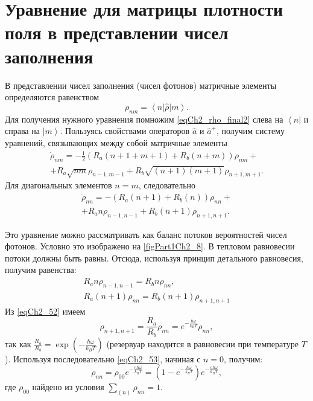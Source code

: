 \section{Уравнение для матрицы плотности поля в представлении чисел
  заполнения}
\label{ch2_7}
В представлении чисел заполнения (чисел фотонов) матричные элементы
определяются равенством
\[
\rho_{nm} = \left<n\right|\hat{\rho}\left|m\right>.
\]
Для получения нужного уравнения помножим
\eqref{eqCh2_rho_final2} слева на $\left<n\right|$ и справа на  
$\left|m\right>$.  Пользуясь
свойствами операторов $\hat{a}$ и $\hat{a}^{+}$,  получим систему
уравнений, связывающих между собой матричные элементы 
\begin{eqnarray}
\dot{\rho}_{nm} = - \frac{1}{2}
\left(
R_a\left(n + 1 + m + 1\right) + 
R_b\left(n + m\right)
\right)\rho_{nm} +
\nonumber \\
+ 
R_a\sqrt{nm}\rho_{n - 1, m - 1} +
R_b\sqrt{\left(n + 1\right)\left(m + 1\right)}\rho_{n + 1, m + 1}.
\label{eqCh2_task5}
\end{eqnarray}
Для диагональных элементов $n = m$,  следовательно
\begin{eqnarray}
\dot{\rho}_{nn} = - 
\left(
R_a\left(n + 1\right) + 
R_b\left(n\right)
\right)\rho_{nn} +
\nonumber \\
+ 
R_a n \rho_{n - 1, n - 1} +
R_b\left(n + 1\right)\rho_{n + 1, n + 1}.
\label{eqCh2_51}
\end{eqnarray}



Это уравнение можно рассматривать как баланс потоков вероятностей
чисел фотонов. Условно это изображено на \autoref{figPart1Ch2_8}. В
тепловом равновесии потоки должны быть равны. Отсюда, используя
принцип детального равновесия, получим равенства: 
\begin{eqnarray}
R_a n \rho_{n - 1, n - 1} = R_b n \rho_{nn},
\nonumber \\
R_a \left(n + 1\right) \rho_{n n} = R_b 
\left(n + 1\right) \rho_{n + 1, n + 1}
\label{eqCh2_52}
\end{eqnarray}
Из \eqref{eqCh2_52} имеем
\begin{equation}
\rho_{n + 1, n + 1} = \frac{R_a}{R_b}\rho_{nn} = 
e^{-\frac{\hbar \omega}{k_B T}}\rho_{nn},
\label{eqCh2_53}
\end{equation}
так как  
\(
\frac{R_a}{R_b} = 
\exp \left(-\frac{\hbar \omega}{k_B T}\right)
\)
(резервуар находится в равновесии при температуре
$T$). Используя последовательно \eqref{eqCh2_53}, начиная с  $n = 0$, 
получим:  
\begin{equation}
\rho_{nn} = \rho_{00} 
e^{-\frac{n \hbar \omega}{k_B T}} =
\left(1 - e^{-\frac{\hbar \omega}{k_B T}}\right) 
e^{-\frac{n \hbar \omega}{k_B T}},
\end{equation}
где $\rho_{00}$ найдено из условия $\sum_{(n)}\rho_{nn} = 1$.

